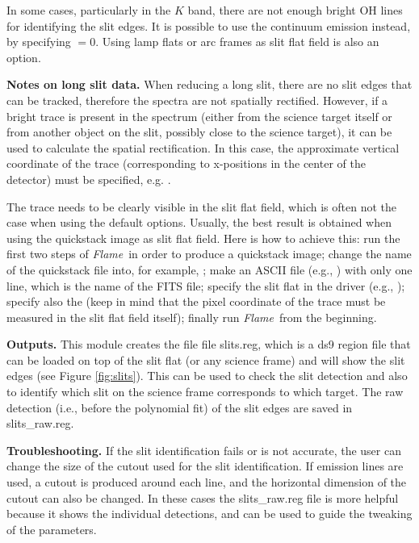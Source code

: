 \documentclass[a4paper]{article}
\newcommand{\flame}{\emph{Flame}}
\begin{document}
\begin{sloppypar}
In some cases, particularly in the $K$ band, there are not enough bright OH lines for identifying the slit edges. It is possible to use the continuum emission instead, by specifying $ = 0$. Using lamp flats or arc frames as slit flat field is also an option.

\medskip
\noindent
\textbf{Notes on long slit data.} When reducing a long slit, there are no slit edges that can be tracked, therefore the spectra are not spatially rectified. However, if a bright trace is present in the spectrum (either from the science target itself or from another object on the slit, possibly close to the science target), it can be used to calculate the spatial rectification. In this case, the approximate vertical coordinate of the trace (corresponding to x-positions in the center of the detector) must be specified, e.g. .

The trace needs to be clearly visible in the slit flat field, which is often not the case when using the default options. Usually, the best result is obtained when using the quickstack image as slit flat field. Here is how to achieve this: run the first two steps of \flame\ in order to produce a quickstack image; change the name of the quickstack file into, for example, ; make an ASCII file (e.g., ) with only one line, which is the name of the FITS file; specify the slit flat in the driver (e.g., ); specify also the  (keep in mind that the pixel coordinate of the trace must be measured in the slit flat field itself); finally run \flame\ from the beginning.

\medskip
\noindent
\textbf{Outputs.} This module creates the file file slits.reg, which is a ds9 region file that can be loaded on top of the slit flat (or any science frame) and will show the slit edges (see Figure \ref{fig:slits}). This can be used to check the slit detection and also to identify which slit on the science frame corresponds to which target. The raw detection (i.e., before the polynomial fit) of the slit edges are saved in slits\_raw.reg.

\medskip
\noindent
\textbf{Troubleshooting.} If the slit identification fails or is not accurate, the user can change the size of the cutout used for the slit identification. If emission lines are used, a cutout is produced around each line, and the horizontal dimension of the cutout can also be changed. In these cases the slits\_raw.reg file is more helpful because it shows the individual detections, and can be used to guide the tweaking of the parameters.


\end{sloppypar}
\end{document}
